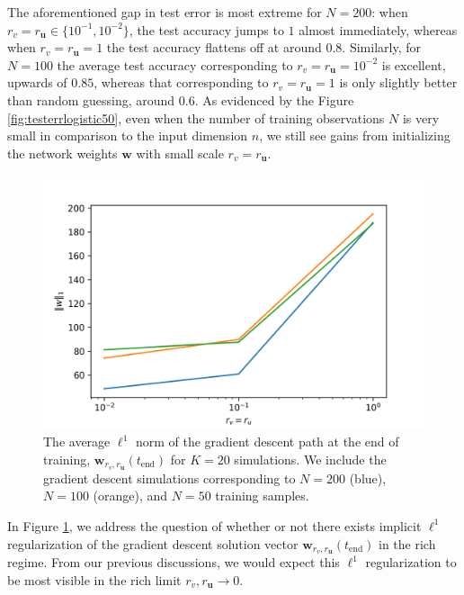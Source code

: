 \documentclass{article}
\begin{document}
The aforementioned gap in test error is most extreme for $N = 200$: when $r_v = r_{\boldsymbol{u}} \in \{10^{-1}, 10^{-2} \}$, the test accuracy jumps to $1$ almost immediately, whereas when $r_v = r_{\boldsymbol{u}} = 1$ the test accuracy flattens off at around $0.8$. Similarly, for $N=100$ the average test accuracy corresponding to $r_v = r_{\boldsymbol{u}} = 10^{-2}$ is excellent, upwards of $0.85$, whereas that corresponding to $r_v = r_{\boldsymbol{u}} = 1$ is only slightly better than random guessing, around $0.6$. As evidenced by the Figure \ref{fig:testerrlogistic50}, even when the number of training observations $N$ is very small in comparison to the input dimension $n$, we still see gains from initializing the network weights $\boldsymbol{w}$ with small scale $r_v = r_{\boldsymbol{u}}$. 

\begin{figure}[H]
    \centering
    \includegraphics{Imgs/Sparse Logistic Regression/param_l1_avg.png}
    \caption{The average $\ell^1$ norm of the gradient descent path at the end of training, $\boldsymbol{w}_{r_v, r_{\boldsymbol{u}}}(t_{\text{end}})$ for $K=20$ simulations. We include the gradient descent simulations corresponding to $N=200$ (blue), $N=100$ (orange), and $N=50$ training samples.}
    \label{fig:solutionl1logistic}
\end{figure}

In Figure \ref{fig:solutionl1logistic}, we address the question of whether or not there exists implicit $\ell^1$ regularization of the gradient descent solution vector $\boldsymbol{w}_{r_v, r_{\boldsymbol{u}}}(t_{\text{end}})$ in the rich regime. From our previous discussions, we would expect this $\ell^1$ regularization to be most visible in the rich limit $r_v, r_{\boldsymbol{u}} \rightarrow 0$.
\end{document}
